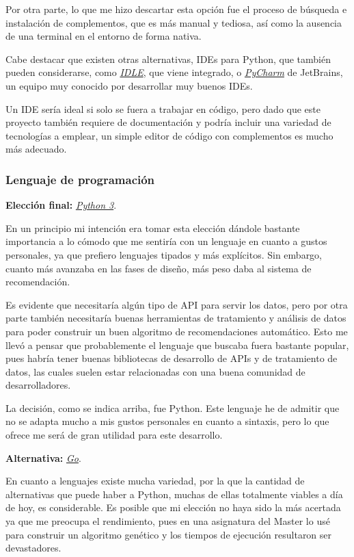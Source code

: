 Por otra parte, lo que me hizo descartar esta opción fue el proceso de búsqueda e instalación de complementos, que es más manual y tediosa, así como la ausencia de una terminal en el entorno de forma nativa.

Cabe destacar que existen otras alternativas, IDEs para Python, que también pueden considerarse, como \href{https://docs.python.org/3/library/idle.html}{\textit{IDLE}}, que viene integrado, o \href{https://www.jetbrains.com/es-es/pycharm/}{\textit{PyCharm}} de JetBrains, un equipo muy conocido por desarrollar muy buenos IDEs.

Un IDE sería ideal si solo se fuera a trabajar en código, pero dado que este proyecto también requiere de documentación y podría incluir una variedad de tecnologías a emplear, un simple editor de código con complementos es mucho más adecuado.

\subsubsection{Lenguaje de programación}

\textbf{Elección final:} \href{https://www.python.org/}{\textit{Python 3}}.

En un principio mi intención era tomar esta elección dándole bastante importancia a lo cómodo que me sentiría con un lenguaje en cuanto a gustos personales, ya que prefiero lenguajes tipados y más explícitos. Sin embargo, cuanto más avanzaba en las fases de diseño, más peso daba al sistema de recomendación. 

Es evidente que necesitaría algún tipo de API para servir los datos, pero por otra parte también necesitaría buenas herramientas de tratamiento y análisis de datos para poder construir un buen algoritmo de recomendaciones automático. Esto me llevó a pensar que probablemente el lenguaje que buscaba fuera bastante popular, pues habría tener buenas bibliotecas de desarrollo de APIs y de tratamiento de datos, las cuales suelen estar relacionadas con una buena comunidad de desarrolladores.

La decisión, como se indica arriba, fue Python. Este lenguaje he de admitir que no se adapta mucho a mis gustos personales en cuanto a sintaxis, pero lo que ofrece me será de gran utilidad para este desarrollo.

\textbf{Alternativa:} \href{https://go.dev/}{\textit{Go}}.

En cuanto a lenguajes existe mucha variedad, por la que la cantidad de alternativas que puede haber a Python, muchas de ellas totalmente viables a día de hoy, es considerable. Es posible que mi elección no haya sido la más acertada ya que me preocupa el rendimiento, pues en una asignatura del Master lo usé para construir un algoritmo genético y los tiempos de ejecución resultaron ser devastadores.

